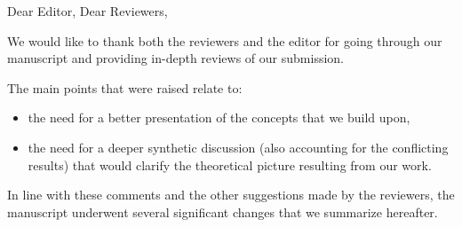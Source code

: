 \documentclass{article}
\begin{document}
Dear Editor, Dear Reviewers,

\vspace{2em}

We would like to thank both the reviewers and the editor for going through our
manuscript and providing in-depth reviews of our submission.

The main points that were raised relate to:
\begin{itemize}
    \item the need for a better presentation of the concepts that we build upon,
    \item the need for a deeper synthetic discussion (also accounting for the
        conflicting results) that would clarify the theoretical
        picture resulting from our work.
\end{itemize}

In line with these comments and the other suggestions made by the reviewers, the
manuscript underwent several significant changes that we summarize hereafter.
\end{document}
